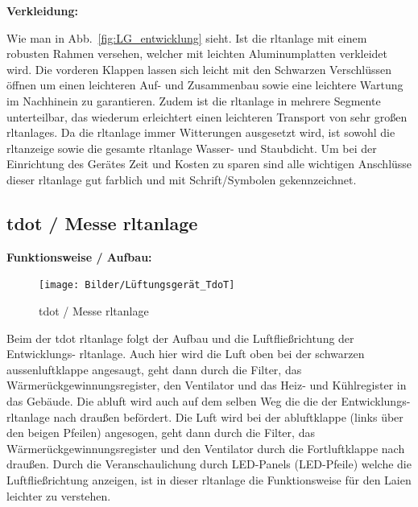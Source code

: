\textbf{Verkleidung:}

Wie man in Abb.~\ref{fig:LG_entwicklung} sieht. Ist die \ac{rltanlage} mit einem robusten Rahmen versehen, welcher mit leichten Aluminumplatten verkleidet wird. Die vorderen Klappen lassen sich leicht mit den Schwarzen Verschlüssen öffnen um einen leichteren Auf- und Zusammenbau sowie eine leichtere Wartung im Nachhinein zu garantieren. Zudem ist die \ac{rltanlage} in mehrere Segmente unterteilbar, das wiederum erleichtert einen leichteren Transport von sehr großen \acp{rltanlage}. Da die \ac{rltanlage} immer Witterungen ausgesetzt wird, ist sowohl die \ac{rltanzeige} sowie die gesamte \ac{rltanlage} Wasser- und Staubdicht. Um bei der Einrichtung des Gerätes Zeit und Kosten zu sparen sind alle wichtigen Anschlüsse dieser \ac{rltanlage} gut farblich und mit Schrift/Symbolen gekennzeichnet. 





\subsection{\gls{tdot} / Messe \ac{rltanlage}}

\textbf{Funktionsweise / Aufbau:}
\begin{figure}[H]
	\centering
	\texttt{[image: Bilder/Lüftungsgerät\_TdoT]}
	\caption{\gls{tdot} / Messe \ac{rltanlage}} 
	\label{fig:LG_tdot}
\end{figure}

Beim der \gls{tdot} \ac{rltanlage} folgt der Aufbau und die Luftfließrichtung der Entwicklungs- \ac{rltanlage}. Auch hier wird die Luft oben bei der schwarzen \gls{aussenluft}klappe angesaugt, geht dann durch die Filter, das Wärmerückgewinnungsregister, den Ventilator und das Heiz- und Kühlregister in das Gebäude. Die \gls{abluft} wird auch auf dem selben Weg die die der Entwicklungs- \ac{rltanlage} nach draußen befördert. Die Luft wird bei der \gls{abluft}klappe (links über den beigen Pfeilen) angesogen, geht dann durch die Filter, das Wärmerückgewinnungsregister und den Ventilator durch die Fortluftklappe nach draußen. Durch die Veranschaulichung durch LED-Panels (LED-Pfeile) welche die Luftfließrichtung anzeigen, ist in dieser \ac{rltanlage} die Funktionsweise für den Laien leichter zu verstehen.

